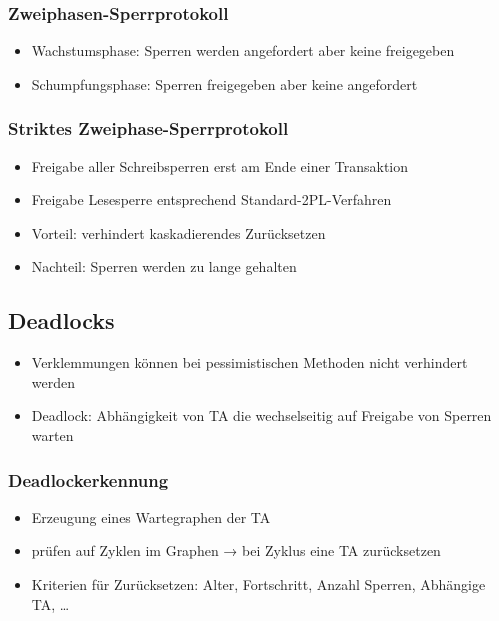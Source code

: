 \documentclass[a4paper]{article}
\begin{document}
    \subsubsection{Zweiphasen-Sperrprotokoll}
    \begin{itemize}
        \item Wachstumsphase: Sperren werden angefordert aber keine freigegeben
        \item Schumpfungsphase: Sperren freigegeben aber keine angefordert
    \end{itemize}

    \subsubsection{Striktes Zweiphase-Sperrprotokoll}
    \begin{itemize}
        \item Freigabe aller Schreibsperren erst am  Ende einer Transaktion
        \item Freigabe Lesesperre entsprechend Standard-2PL-Verfahren
        \item Vorteil: verhindert kaskadierendes Zurücksetzen
        \item Nachteil: Sperren werden zu lange gehalten
    \end{itemize}
    

\subsection{Deadlocks}
\begin{itemize}
    \item Verklemmungen können bei pessimistischen Methoden nicht verhindert werden
    \item Deadlock: Abhängigkeit von TA die wechselseitig auf Freigabe von Sperren warten
\end{itemize}

    \subsubsection{Deadlockerkennung}
    \begin{itemize}
        \item Erzeugung eines Wartegraphen der TA
        \item prüfen auf Zyklen im Graphen → bei Zyklus eine TA zurücksetzen
        \item Kriterien für Zurücksetzen: Alter, Fortschritt, Anzahl Sperren, Abhängige TA, …
    \end{itemize}
\end{document}
